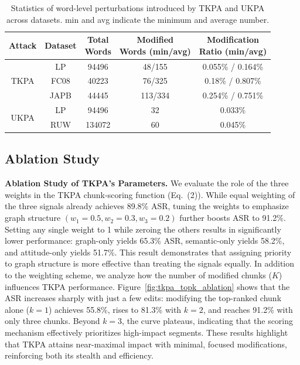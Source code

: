 \documentclass[letterpaper]{article} %
\begin{document}
\begin{table}[t]
\setlength{\tabcolsep}{2pt}
\centering
\small
\begin{tabular}{ccccc}
\toprule
\textbf{Attack} & \textbf{Dataset} & \makecell{\textbf{Total}\\\textbf{Words}} & \makecell{\textbf{Modified}\\\textbf{Words (min/avg)}} & \makecell{\textbf{Modification}\\\textbf{Ratio (min/avg)}} \\
\midrule
\multirow{3}{*}{TKPA}
&LP & 94496 & 48/155 & 0.055\% / 0.164\% \\
&FC08   & 40223 & 76/325         & 0.18\% / 0.807\% \\
&JAPB & 44445 & 113/334        & 0.254\% / 0.751\% \\
\midrule
\multirow{2}{*}{UKPA}
&LP & 94496  & 32 & 0.033\% \\
&RUW   & 134072 & 60 & 0.045\% \\
\bottomrule
\end{tabular}
\caption{Statistics of word-level perturbations introduced by TKPA and UKPA across datasets. min and avg indicate the minimum and average number.}
\label{tab:Words_modification}
\end{table}



\subsection{Ablation Study}
\textbf{Ablation Study of TKPA's Parameters.}
We evaluate the role of the three weights in the TKPA chunk‑scoring function (Eq.~(2)).
While equal weighting of the three signals already achieves 89.8\% ASR, tuning the weights to emphasize graph structure $(w_1=0.5,w_2=0.3,w_3=0.2)$ further boosts ASR to 91.2\%.
Setting any single weight to 1 while zeroing the others results in significantly lower performance: graph-only yields 65.3\% ASR, semantic-only yields 58.2\%, and attitude-only yields 51.7\%.
This result demonstrates that assigning priority to graph structure is more effective than treating the signals equally. In addition to the weighting scheme, we analyze how the number of modified chunks ($K$) influences TKPA performance. Figure~\ref{fig:tkpa_topk_ablation} shows that the ASR increases sharply with just a few edits: modifying the top-ranked chunk alone ($k=1$) achieves 55.8\%, rises to 81.3\% with $k=2$, and reaches 91.2\% with only three chunks. Beyond $k=3$, the curve plateaus, indicating that the scoring mechanism effectively prioritizes high-impact segments. These results highlight that TKPA attains near-maximal impact with minimal, focused modifications, reinforcing both its stealth and efficiency.
\end{document}
